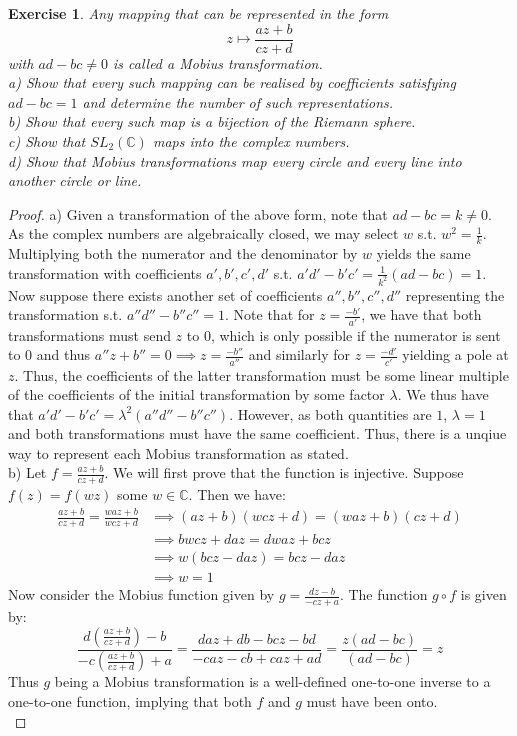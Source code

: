 \documentclass{article}
\newcommand{\bb}[1]{\mathbb{#1}}
\newtheorem{exercise}{Exercise}
\begin{document}
\begin{exercise}
  Any mapping that can be represented in the form \[z \mapsto \frac{az + b}{cz + d}\] with $ad -bc \neq 0$ is called a Mobius transformation. \\
  a) Show that every such mapping can be realised by coefficients satisfying $ad-bc = 1$ and determine the number of such representations. \\
  b) Show that every such map is a bijection of the Riemann sphere. \\
  c) Show that $SL_{2}(\bb{C})$ maps into the complex numbers. \\
  d) Show that Mobius transformations map every circle and every line into another circle or line. 
\end{exercise}
\begin{proof}
  a) Given a transformation of the above form, note that $ad-bc = k \neq 0$. As the complex numbers are algebraically closed, we may select $w$ s.t. $w^{2} = \frac{1}{k}$. Multiplying both the numerator and the denominator by $w$ yields the same transformation with coefficients $a', b', c', d'$ s.t. $a'd' - b'c' = \frac{1}{k^{2}}(ad-bc) = 1$. Now suppose there exists another set of coefficients $a'',b'', c'', d''$ representing the transformation s.t. $a''d'' - b''c'' = 1$. Note that for $z = \frac{-b'}{a'}$, we have that both transformations must send $z$ to 0, which is only possible if the numerator is sent to $0$ and thus $a''z + b'' = 0 \implies z = \frac{-b''}{a''}$ and similarly for $z = \frac{-d'}{c'}$ yielding a pole at $z$. Thus, the coefficients of the latter transformation must be some linear multiple of the coefficients of the initial transformation by some factor $\lambda$. We thus have that $a'd' - b'c' = \lambda^{2}(a''d'' - b''c'')$. However, as both quantities are $1$, $\lambda = 1$ and both transformations must have the same coefficient. Thus, there is a unqiue way to represent each Mobius transformation as stated. \\
  
  b) Let $f = \frac{az + b}{cz+d}$. We will first prove that the function is injective. Suppose $f(z) = f(wz)$ some $w \in \bb{C}$. Then we have:
  \begin{align*}
    \frac{az + b}{cz + d} = \frac{waz + b}{wcz + d} & \implies (az + b)(wcz + d) = (waz + b)(cz + d) \\
                                                    & \implies bwcz + daz = dwaz + bcz \\
                                                    &  \implies w(bcz - daz) = bcz - daz \\
                                                    & \implies w = 1
  \end{align*}
  Now consider the Mobius function given by $g = \frac{dz - b}{- cz + a}$. The function $g \circ f$ is given by:
  \[
    \frac{d\left(\frac{az+b}{cz+d}\right) - b}{-c\left(\frac{az+b}{cz+d}\right) + a} = \frac{daz + db - bcz -bd}{-caz-cb+caz+ad} = \frac{z(ad-bc)}{(ad-bc)} = z
  \]
  Thus $g$ being a Mobius transformation is a well-defined one-to-one inverse to a one-to-one function, implying that both $f$ and $g$ must have been onto. \\


\end{proof}
\end{document}
